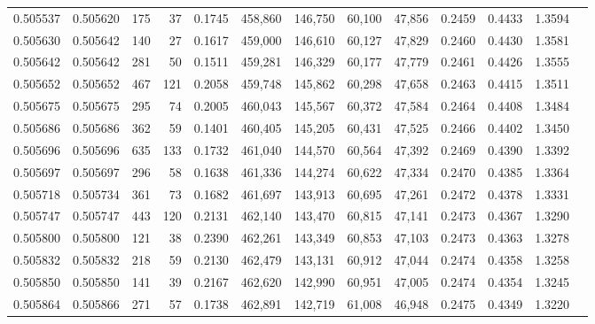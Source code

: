 \begin{tabular}{rrrrrrrrrrrrr}
0.505537 & 0.505620 &   175 &    37 &                                     0.1745 & 458,860 & 146,750 &  60,100 &  47,856 & 0.2459 & 0.4433 & 1.3594 \\
0.505630 & 0.505642 &   140 &    27 &                                     0.1617 & 459,000 & 146,610 &  60,127 &  47,829 & 0.2460 & 0.4430 & 1.3581 \\
0.505642 & 0.505642 &   281 &    50 &                                     0.1511 & 459,281 & 146,329 &  60,177 &  47,779 & 0.2461 & 0.4426 & 1.3555 \\
0.505652 & 0.505652 &   467 &   121 &                                     0.2058 & 459,748 & 145,862 &  60,298 &  47,658 & 0.2463 & 0.4415 & 1.3511 \\
0.505675 & 0.505675 &   295 &    74 &                                     0.2005 & 460,043 & 145,567 &  60,372 &  47,584 & 0.2464 & 0.4408 & 1.3484 \\
0.505686 & 0.505686 &   362 &    59 &                                     0.1401 & 460,405 & 145,205 &  60,431 &  47,525 & 0.2466 & 0.4402 & 1.3450 \\
0.505696 & 0.505696 &   635 &   133 &                                     0.1732 & 461,040 & 144,570 &  60,564 &  47,392 & 0.2469 & 0.4390 & 1.3392 \\
0.505697 & 0.505697 &   296 &    58 &                                     0.1638 & 461,336 & 144,274 &  60,622 &  47,334 & 0.2470 & 0.4385 & 1.3364 \\
0.505718 & 0.505734 &   361 &    73 &                                     0.1682 & 461,697 & 143,913 &  60,695 &  47,261 & 0.2472 & 0.4378 & 1.3331 \\
0.505747 & 0.505747 &   443 &   120 &                                     0.2131 & 462,140 & 143,470 &  60,815 &  47,141 & 0.2473 & 0.4367 & 1.3290 \\
0.505800 & 0.505800 &   121 &    38 &                                     0.2390 & 462,261 & 143,349 &  60,853 &  47,103 & 0.2473 & 0.4363 & 1.3278 \\
0.505832 & 0.505832 &   218 &    59 &                                     0.2130 & 462,479 & 143,131 &  60,912 &  47,044 & 0.2474 & 0.4358 & 1.3258 \\
0.505850 & 0.505850 &   141 &    39 &                                     0.2167 & 462,620 & 142,990 &  60,951 &  47,005 & 0.2474 & 0.4354 & 1.3245 \\
0.505864 & 0.505866 &   271 &    57 &                                     0.1738 & 462,891 & 142,719 &  61,008 &  46,948 & 0.2475 & 0.4349 & 1.3220 \\

\end{tabular}
